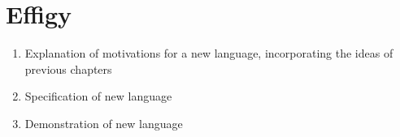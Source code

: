 \chapter{Effigy}

\begin{enumerate}
  \item Explanation of motivations for a new language, incorporating the ideas of previous chapters
  \item Specification of new language
  \item Demonstration of new language
\end{enumerate}
